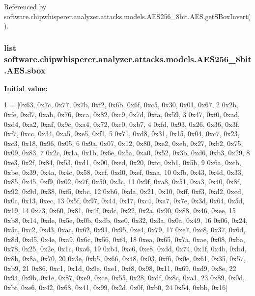 Referenced by software.\+chipwhisperer.\+analyzer.\+attacks.\+models.\+A\+E\+S256\+\_\+8bit.\+A\+E\+S.\+get\+S\+Box\+Invert().

\hypertarget{classsoftware_1_1chipwhisperer_1_1analyzer_1_1attacks_1_1models_1_1AES256__8bit_1_1AES_a6234bbf12e9e732f4b9890ada19c54dc}{}
\subsubsection[{sbox}]{\setlength{\rightskip}{0pt plus 5cm}list software.\+chipwhisperer.\+analyzer.\+attacks.\+models.\+A\+E\+S256\+\_\+8bit.\+A\+E\+S.\+sbox\hspace{0.3cm}{\ttfamily [static]}}\label{classsoftware_1_1chipwhisperer_1_1analyzer_1_1attacks_1_1models_1_1AES256__8bit_1_1AES_a6234bbf12e9e732f4b9890ada19c54dc}
{\bfseries Initial value\+:}
\begin{DoxyCode}
1 = [0x63, 0x7c, 0x77, 0x7b, 0xf2, 0x6b, 0x6f, 0xc5, 0x30, 0x01, 0x67,
2             0x2b, 0xfe, 0xd7, 0xab, 0x76, 0xca, 0x82, 0xc9, 0x7d, 0xfa, 0x59,
3             0x47, 0xf0, 0xad, 0xd4, 0xa2, 0xaf, 0x9c, 0xa4, 0x72, 0xc0, 0xb7,
4             0xfd, 0x93, 0x26, 0x36, 0x3f, 0xf7, 0xcc, 0x34, 0xa5, 0xe5, 0xf1,
5             0x71, 0xd8, 0x31, 0x15, 0x04, 0xc7, 0x23, 0xc3, 0x18, 0x96, 0x05,
6             0x9a, 0x07, 0x12, 0x80, 0xe2, 0xeb, 0x27, 0xb2, 0x75, 0x09, 0x83,
7             0x2c, 0x1a, 0x1b, 0x6e, 0x5a, 0xa0, 0x52, 0x3b, 0xd6, 0xb3, 0x29,
8             0xe3, 0x2f, 0x84, 0x53, 0xd1, 0x00, 0xed, 0x20, 0xfc, 0xb1, 0x5b,
9             0x6a, 0xcb, 0xbe, 0x39, 0x4a, 0x4c, 0x58, 0xcf, 0xd0, 0xef, 0xaa,
10             0xfb, 0x43, 0x4d, 0x33, 0x85, 0x45, 0xf9, 0x02, 0x7f, 0x50, 0x3c,
11             0x9f, 0xa8, 0x51, 0xa3, 0x40, 0x8f, 0x92, 0x9d, 0x38, 0xf5, 0xbc,
12             0xb6, 0xda, 0x21, 0x10, 0xff, 0xf3, 0xd2, 0xcd, 0x0c, 0x13, 0xec,
13             0x5f, 0x97, 0x44, 0x17, 0xc4, 0xa7, 0x7e, 0x3d, 0x64, 0x5d, 0x19,
14             0x73, 0x60, 0x81, 0x4f, 0xdc, 0x22, 0x2a, 0x90, 0x88, 0x46, 0xee,
15             0xb8, 0x14, 0xde, 0x5e, 0x0b, 0xdb, 0xe0, 0x32, 0x3a, 0x0a, 0x49,
16             0x06, 0x24, 0x5c, 0xc2, 0xd3, 0xac, 0x62, 0x91, 0x95, 0xe4, 0x79,
17             0xe7, 0xc8, 0x37, 0x6d, 0x8d, 0xd5, 0x4e, 0xa9, 0x6c, 0x56, 0xf4,
18             0xea, 0x65, 0x7a, 0xae, 0x08, 0xba, 0x78, 0x25, 0x2e, 0x1c, 0xa6,
19             0xb4, 0xc6, 0xe8, 0xdd, 0x74, 0x1f, 0x4b, 0xbd, 0x8b, 0x8a, 0x70,
20             0x3e, 0xb5, 0x66, 0x48, 0x03, 0xf6, 0x0e, 0x61, 0x35, 0x57, 0xb9,
21             0x86, 0xc1, 0x1d, 0x9e, 0xe1, 0xf8, 0x98, 0x11, 0x69, 0xd9, 0x8e,
22             0x94, 0x9b, 0x1e, 0x87, 0xe9, 0xce, 0x55, 0x28, 0xdf, 0x8c, 0xa1,
23             0x89, 0x0d, 0xbf, 0xe6, 0x42, 0x68, 0x41, 0x99, 0x2d, 0x0f, 0xb0,
24             0x54, 0xbb, 0x16]
\end{DoxyCode}


